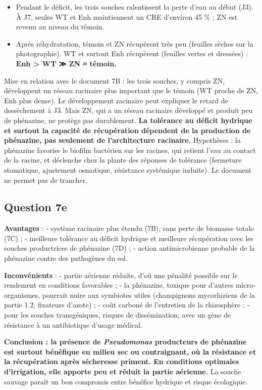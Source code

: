 \documentclass[11pt,a4paper]{article}
\providecommand{\tightlist}{\setlength{\itemsep}{0pt}\setlength{\parskip}{0pt}}
\begin{document}
\begin{itemize}
\tightlist
\item
  Pendant le déficit, les trois souches ralentissent la perte d'eau au début (J3). À J7, seules WT et Enh maintiennent un CRE d'environ 45 \% ; ZN est revenu au niveau du témoin.
\item
  Après réhydratation, témoin et ZN récupèrent très peu (feuilles sèches sur la photographie). WT et surtout Enh récupèrent (feuilles vertes et dressées) : \textbf{Enh \textgreater{} WT ≫ ZN ≈ témoin.}
\end{itemize}

Mise en relation avec le document 7B : les trois souches, y compris ZN, développent un réseau racinaire plus important que le témoin (WT proche de ZN, Enh plus dense). Le développement racinaire peut expliquer le retard de dessèchement à J3. Mais ZN, qui a un réseau racinaire développé et produit peu de phénazine, ne protège pas durablement. \textbf{La tolérance au déficit hydrique et surtout la capacité de récupération dépendent de la production de phénazine, pas seulement de l'architecture racinaire.} Hypothèses : la phénazine favorise le biofilm bactérien sur les racines, qui retient l'eau au contact de la racine, et déclenche chez la plante des réponses de tolérance (fermeture stomatique, ajustement osmotique, résistance systémique induite). Le document ne permet pas de trancher.

\hypertarget{question-7e}{%
\subsection{Question 7e}\label{question-7e}}

\textbf{Avantages} :
- système racinaire plus étendu (7B), sans perte de biomasse totale (7C) ;
- meilleure tolérance au déficit hydrique et meilleure récupération avec les souches productrices de phénazine (7D) ;
- action antimicrobienne probable de la phénazine contre des pathogènes du sol.

\textbf{Inconvénients} :
- partie aérienne réduite, d'où une pénalité possible sur le rendement en conditions favorables ;
- la phénazine, toxique pour d'autres micro-organismes, pourrait nuire aux symbiotes utiles (champignons mycorhiziens de la partie 1.2, fixateurs d'azote) ;
- coût carboné de l'entretien de la rhizosphère ;
- pour les souches transgéniques, risques de dissémination, avec un gène de résistance à un antibiotique d'usage médical.

\textbf{Conclusion : la présence de \emph{Pseudomonas} producteurs de phénazine est surtout bénéfique en milieu sec ou contraignant, où la résistance et la récupération après sécheresse priment. En conditions optimales d'irrigation, elle apporte peu et réduit la partie aérienne.} La souche sauvage paraît un bon compromis entre bénéfice hydrique et risque écologique.
\end{document}
